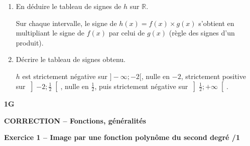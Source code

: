 \documentclass[10pt,a4paper]{article}
\renewcommand{\niveau}{1G}
\renewcommand{\chapitre}{Fonctions, généralités}
\renewcommand{\interroversion}[1]{
    \noindent\textbf{\niveau}

    \vspace{-0.5cm}
    \begin{center}
        \textbf{\large CORRECTION -- \chapitre}
    \end{center}

    \vspace{0.1cm}
}
\begin{document}
\begin{sujets}
\begin{enumerate}
\begin{center}
\begin{minipage}{0.48\linewidth}
\(f\) a pour coefficient directeur \(a=4>0\) : \(f\) est croissante.
\[
\begin{aligned}
f(x)&>0\\
4x-2&>0 &\scriptstyle(+2)\\
4x&>2 &\scriptstyle(\div 4)\\
x&>\frac{1}{2}.
\end{aligned}
\]
\end{minipage}
\hfill
\begin{minipage}{0.48\linewidth}
\(g\) a pour coefficient directeur \(a=-2<0\) : \(g\) est décroissante.
\[
\begin{aligned}
g(x)&>0\\
-2x-4&>0 &\scriptstyle(+4)\\
-2x&>4 &\scriptstyle(\div(-2))\\
x&<-2.
\end{aligned}
\]
\end{minipage}
\end{center}

\item En déduire le tableau de signes de \(h\) sur \(\mathbb{R}\).

Sur chaque intervalle, le signe de \(h(x)=f(x)\times g(x)\) s'obtient en multipliant le signe de \(f(x)\) par celui de \(g(x)\) (règle des signes d'un produit).

\begin{center}
\end{center}

\item Décrire le tableau de signes obtenu.

\(h\) est strictement négative sur \(]-\infty;-2[\), nulle en \(-2\), strictement positive sur \(\left]-2;\frac{1}{2}\right[\), nulle en \(\frac{1}{2}\), puis strictement négative sur \(\left]\frac{1}{2};+\infty\right[\).
\end{enumerate}

\columnbreak

\interroversion{D}

\textbf{Exercice 1 -- Image par une fonction polynôme du second degré \hfill /1}


\end{sujets}
\end{document}
